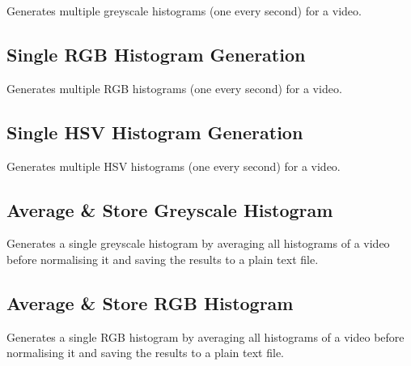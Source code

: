 Generates multiple greyscale histograms (one every second) for a video.




\subsection{Single RGB Histogram Generation}
\label{sec:code-single_rgb_histogram_generation}

Generates multiple RGB histograms (one every second) for a video.




\subsection{Single HSV Histogram Generation}
\label{sec:code-average_and}

Generates multiple HSV histograms (one every second) for a video.




\subsection{Average \& Store Greyscale Histogram}
\label{sec:code-generate_and_store_average_grey_histogram}

Generates a single greyscale histogram by averaging all histograms of a video before normalising it and saving the results to a plain text file.




\subsection{Average \& Store RGB Histogram}
\label{sec:code-generate_and_store_average_rgb_histogram}

Generates a single RGB histogram by averaging all histograms of a video before normalising it and saving the results to a plain text file.

